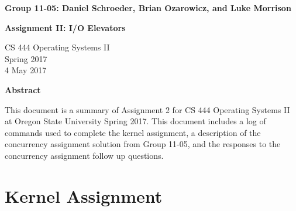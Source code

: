 \documentclass[10pt,letterpaper,draftclsnofoot,onecolumn]{IEEEtran}
\begin{document}
\begin{titlepage}
    \begin{center}
        \vspace*{3.5cm}

        \textbf{Group 11-05: Daniel Schroeder, Brian Ozarowicz, and Luke Morrison}

        \vspace{0.5cm}

        \textbf{Assignment II: I/O Elevators}

        \vspace{0.8cm}

        CS 444 Operating Systems II\\
        Spring 2017\\
        4 May 2017\\

        \vspace{1cm}

        \textbf{Abstract}\\

        \vspace{0.5cm}
			
			This document is a summary of Assignment 2 for CS 444 Operating Systems II at Oregon State University Spring 2017. This document includes a log of commands used to complete the kernel assignment, a description of the concurrency assignment solution from Group 11-05, and the responses to the concurrency assignment follow up questions.\\

        \vfill

    \end{center}
\end{titlepage}


\section{Kernel Assignment}
\bigskip
\end{document}
